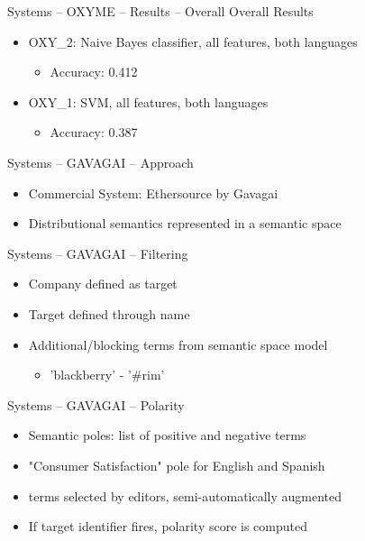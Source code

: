 \documentclass[12pt,a4paper]{beamer}
\begin{document}
\begin{frame}{Systems -- OXYME -- Results -- Overall}
Overall Results
\begin{itemize}
 \item OXY\_2: Naive Bayes classifier, all features, both languages
  \begin{itemize}
  \item Accuracy: 0.412
  \end{itemize}
\item OXY\_1: SVM, all features, both languages
  \begin{itemize}
  \item Accuracy: 0.387
  \end{itemize}
\end{itemize}

\end{frame}

\begin{frame}{Systems -- GAVAGAI -- Approach}
\begin{itemize}
\item Commercial System: Ethersource by Gavagai \cite{gavagai}
\item Distributional semantics represented in a semantic space
\end{itemize}

\end{frame}


\begin{frame}{Systems -- GAVAGAI -- Filtering}
\begin{itemize}
\item Company defined as target
\item Target defined through name
\item Additional/blocking terms from semantic space model
  \begin{itemize}
  \item 'blackberry' - '\#rim'
  \end{itemize}
\end{itemize}

\end{frame}

\begin{frame}{Systems -- GAVAGAI -- Polarity}
\begin{itemize}
\item Semantic poles: list of positive and negative terms
\item "Consumer Satisfaction" pole for English and Spanish
\item terms selected by editors, semi-automatically augmented
\item If target identifier fires, polarity score is computed
\end{itemize}

\end{frame}
\end{document}
